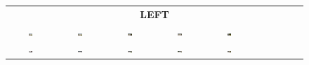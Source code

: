\begin{figure}
\begin{tabular}{cccccccccc}
        \multicolumn{10}{c}{\textbf{LEFT}} \\
        \includegraphics[width=0.1\textwidth]{img/diversity/left_01.png} &
        \includegraphics[width=0.1\textwidth]{img/diversity/left_02.png} &
        \includegraphics[width=0.1\textwidth]{img/diversity/left_03.png} &
        \includegraphics[width=0.1\textwidth]{img/diversity/left_04.png} &
        \includegraphics[width=0.1\textwidth]{img/diversity/left_05.png} & \\ 
        \includegraphics[width=0.1\textwidth]{img/diversity/left_06.png} &
        \includegraphics[width=0.1\textwidth]{img/diversity/left_07.png} &
        \includegraphics[width=0.1\textwidth]{img/diversity/left_08.png} &
        \includegraphics[width=0.1\textwidth]{img/diversity/left_09.png} &
        \includegraphics[width=0.1\textwidth]{img/diversity/left_10.png} \\


\end{tabular}
\end{figure}
